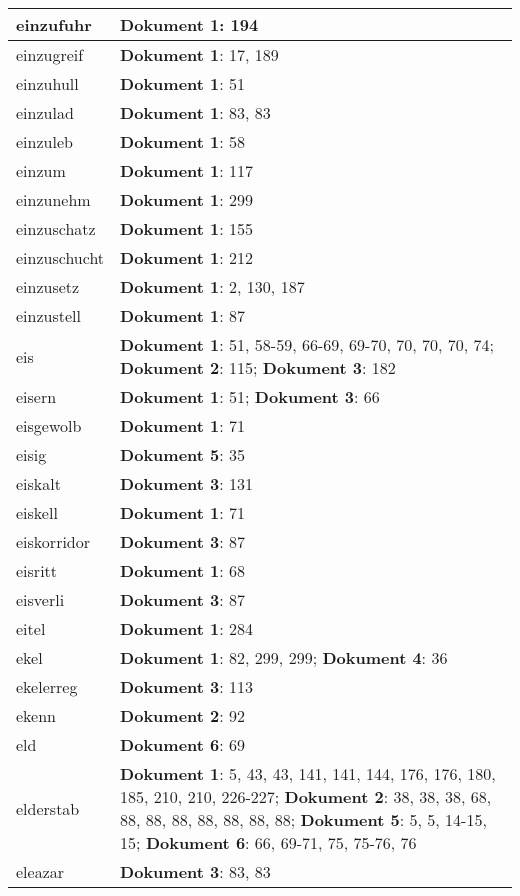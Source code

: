 \documentclass[a5paper]{article}
\begin{document}
\begin{longtable}[l]{|l|p{3in}|}
\hline
einzufuhr & \textbf{Dokument 1}: 194 \\
\hline
einzugreif & \textbf{Dokument 1}: 17, 189 \\
\hline
einzuhull & \textbf{Dokument 1}: 51 \\
\hline
einzulad & \textbf{Dokument 1}: 83, 83 \\
\hline
einzuleb & \textbf{Dokument 1}: 58 \\
\hline
einzum & \textbf{Dokument 1}: 117 \\
\hline
einzunehm & \textbf{Dokument 1}: 299 \\
\hline
einzuschatz & \textbf{Dokument 1}: 155 \\
\hline
einzuschucht & \textbf{Dokument 1}: 212 \\
\hline
einzusetz & \textbf{Dokument 1}: 2, 130, 187 \\
\hline
einzustell & \textbf{Dokument 1}: 87 \\
\hline
eis & \textbf{Dokument 1}: 51, 58-59, 66-69, 69-70, 70, 70, 70, 74; \textbf{Dokument 2}: 115; \textbf{Dokument 3}: 182 \\
\hline
eisern & \textbf{Dokument 1}: 51; \textbf{Dokument 3}: 66 \\
\hline
eisgewolb & \textbf{Dokument 1}: 71 \\
\hline
eisig & \textbf{Dokument 5}: 35 \\
\hline
eiskalt & \textbf{Dokument 3}: 131 \\
\hline
eiskell & \textbf{Dokument 1}: 71 \\
\hline
eiskorridor & \textbf{Dokument 3}: 87 \\
\hline
eisritt & \textbf{Dokument 1}: 68 \\
\hline
eisverli & \textbf{Dokument 3}: 87 \\
\hline
eitel & \textbf{Dokument 1}: 284 \\
\hline
ekel & \textbf{Dokument 1}: 82, 299, 299; \textbf{Dokument 4}: 36 \\
\hline
ekelerreg & \textbf{Dokument 3}: 113 \\
\hline
ekenn & \textbf{Dokument 2}: 92 \\
\hline
eld & \textbf{Dokument 6}: 69 \\
\hline
elderstab & \textbf{Dokument 1}: 5, 43, 43, 141, 141, 144, 176, 176, 180, 185, 210, 210, 226-227; \textbf{Dokument 2}: 38, 38, 38, 68, 88, 88, 88, 88, 88, 88, 88; \textbf{Dokument 5}: 5, 5, 14-15, 15; \textbf{Dokument 6}: 66, 69-71, 75, 75-76, 76 \\
\hline
eleazar & \textbf{Dokument 3}: 83, 83 \\

\end{longtable}
\end{document}
